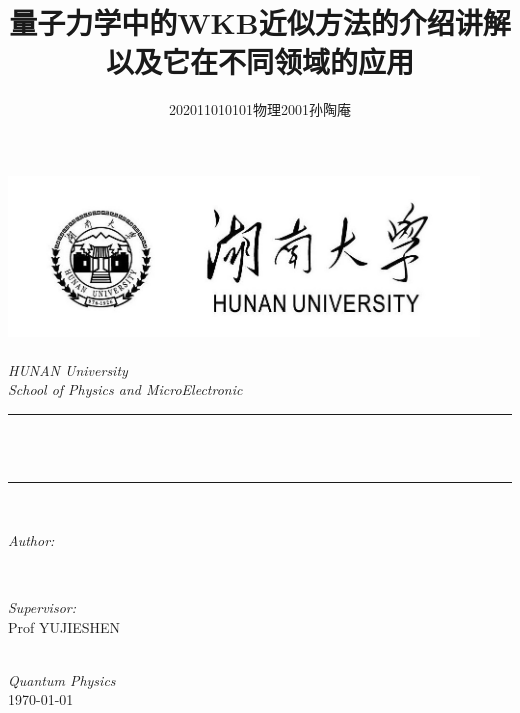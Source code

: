 \documentclass[12pt]{article}
\title{量子力学中的WKB近似方法的介绍讲解以及它在不同领域的应用}
\author{202011010101物理2001孙陶庵}
\begin{document}
\def\hbar{\text{\textit{ħ}}}

    \renewcommand\theequation{\thesubsection.\arabic{equation}}
    \newtheorem{mythm}{定理}[section]  %

\begin{titlepage}
	\newcommand{\HRule}{\rule{\linewidth}{0.5mm}}
	\includegraphics[width=12.5cm]{sc_logo.jpg}\\[0cm] 
	\center 
	\quad\\[1.5cm]
	\textsl{\Large HUNAN University }\\[0.5cm] 
	\textsl{\large School of Physics and MicroElectronic}\\[0.5cm] 
	\makeatletter
	\HRule \\[0.4cm]
	{ \huge \bfseries \@title}\\[0.4cm] 
	\HRule \\[1.5cm]
	\begin{minipage}{0.4\textwidth}
		\begin{flushleft} \large
			\emph{Author:}\\
			\@author 
		\end{flushleft}
	\end{minipage}
	~
	\begin{minipage}{0.4\textwidth}
		\begin{flushright} \large
			\emph{Supervisor:} \\
			\textup{Prof YUJIESHEN}
		\end{flushright}
	\end{minipage}\\[3cm]
	\makeatother
	{\large \emph{Quantum Physics}}\\[0.5cm]
	{\large \today}\\[2cm] 
	\vfill 
\end{titlepage}
\thispagestyle{empty}
\clearpage     %
\tableofcontents        %
\clearpage     %
\end{document}
